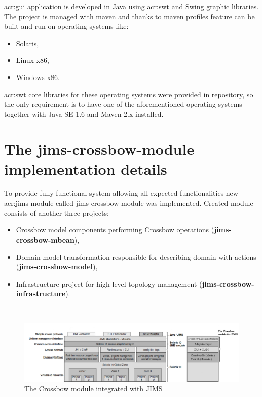 \documentclass[11pt,openany]{book}
\begin{document}
        \gls{acr:gui} application is developed in Java using \gls{acr:swt} and Swing graphic libraries. The project is
        managed with maven and thanks to maven profiles feature can be built and run on operating systems like:

        \begin{itemize}
          \item Solaris,
          \item Linux x86,
          \item Windows x86.
        \end{itemize}

        \gls{acr:swt} core libraries for these operating systems were provided in repository, so the only requirement is
        to have one of the aforementioned operating systems together with Java SE 1.6 and Maven 2.x installed.


    \section{The jims-crossbow-module implementation details}
    \label{sec:impl:module}

      To provide fully functional system allowing all expected functionalities new \gls{acr:jims} module called
      jims-crossbow-module was implemented. Created module consists of another three projects:

      \begin{itemize}
        \item Crossbow model components performing Crossbow operations (\textbf{jims-crossbow-mbean}),
        \item Domain model transformation responsible for describing domain with actions (\textbf{jims-crossbow-model}),
        \item Infrastructure project for high-level topology management (\textbf{jims-crossbow-infrastructure}).
      \end{itemize}

      \vfill

      ~ 

      \begin{figure}[H]
        \centering
        \includegraphics[width=1.26\textwidth, angle=90]{img/impl/jims_and_cm4j.png}

        \caption{The Crossbow module integrated with JIMS \cite{jims}}
      \end{figure}
		
\end{document}
